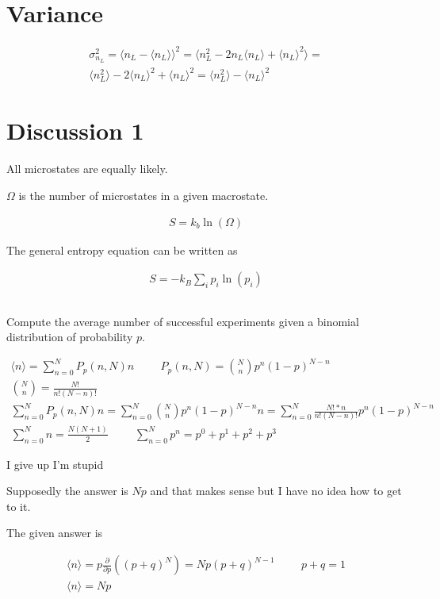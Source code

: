 \documentclass[fleqn]{report}
\newcommand{\hp}{\hspace{1cm}}
\newcommand{\del}{\partial}
\newcommand{\equations} [1] {
\begin{gather*}
#1
\end{gather*}
}
\begin{document}
\section{Variance}
\equations{
    \sigma_{n_L}^2
    =
    \langle 
        n_L - \langle n_L \rangle 
    \rangle^2
    =
    \langle 
        n_L^2 - 2 n_L \langle n_L \rangle 
        +
        \langle n_L \rangle^2 
    \rangle
    =
    \\
    \langle n_L^2 \rangle 
    -
    2 \langle n_L \rangle^2 + \langle n_L \rangle^2 = 
    \langle n_L^2 \rangle - \langle n_L \rangle^2
}

\section{Discussion 1}
All microstates are equally likely. 

$\Omega$ is the number of microstates in a given macrostate. 

\equations{
    S 
    =
    k_b \ln(\Omega) 
}

The general entropy equation can be written as 
\equations{
    S
    =
    -k_B 
    \sum_i 
    p_i \ln(p_i)
}

\subsection{}
Compute the average number of successful experiments given 
a binomial distribution of probability $p$. 

\equations{
    \langle n \rangle 
    =
    \sum^N_{n=0}
    P_p(n, N) n
    \hp 
    P_p(n, N)
    =
    {N \choose n}
    p^n (1 - p)^{N - n}
    \\
    {N \choose n}
    =
    \frac{N!}{n! (N - n)!}
    \\
    \sum^N_{n=0}
    P_p(n, N) n
    =
    \sum^N_{n=0}
    {N \choose n}
    p^n (1 - p)^{N - n}
    n
    =
    \sum^N_{n=0}
    \frac{N! * n}{n! (N - n)!}
    p^n (1 - p)^{N - n}
    \\
    \sum^N_{n=0}
    n 
    =
    \frac{N(N+1)}{2}
    \hp 
    \sum^N_{n=0}
    p^n 
    =
    p^0 + p^1 + p^2 + p^3
}
I give up I'm stupid 

Supposedly the answer is $Np$ and that makes sense but I have no idea 
how to get to it.

The given answer is 
\equations{
    \langle n \rangle 
    =
    p \frac{\del }{\del p}
    \left(
        (p + q)^N
    \right)
    =
    Np(p + q)^{N-1}
    \hp
    p + q = 1
    \\
    \langle n \rangle 
    =
    Np
}
\end{document}
